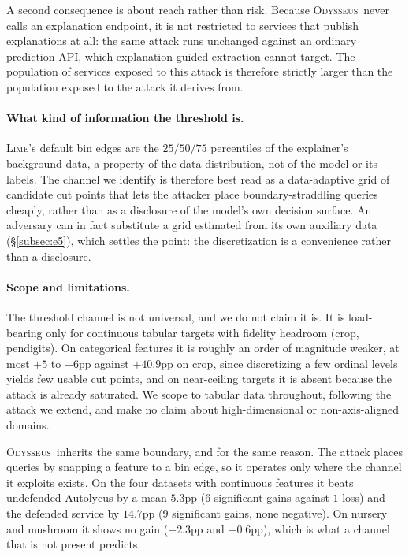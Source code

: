 \documentclass[sigconf,anonymous,review]{acmart}
\newcommand{\sys}{\textsc{Odysseus}}
\begin{document}
A second consequence is about reach rather than risk. Because \sys\ never calls an explanation
endpoint, it is not restricted to services that publish explanations at all: the same attack runs
unchanged against an ordinary prediction API, which explanation-guided extraction cannot target. The
population of services exposed to this attack is therefore strictly larger than the population exposed
to the attack it derives from.

\paragraph{What kind of information the threshold is.} \textsc{Lime}'s default bin edges are the
$25/50/75$ percentiles of the explainer's background data, a property of the data distribution, not of the model or its labels. The channel we identify is therefore best read as a data-adaptive grid of
candidate cut points that lets the attacker place boundary-straddling queries cheaply, rather than as
a disclosure of the model's own decision surface. An adversary can in fact substitute a grid estimated
from its own auxiliary data (\S\ref{subsec:e5}), which settles the point: the discretization is a
convenience rather than a disclosure.

\paragraph{Scope and limitations.} The threshold channel is not universal, and we do not claim it is.
It is load-bearing only for continuous tabular targets with fidelity headroom (crop, pendigits). On
categorical features it is roughly an order of magnitude weaker, at most $+5$ to $+6$pp against
$+40.9$pp on crop, since discretizing a few ordinal levels yields few usable cut points, and on
near-ceiling targets it is absent because the attack is already saturated. We scope to tabular data throughout, following the attack we extend, and make no
claim about high-dimensional or non-axis-aligned domains.

\sys\ inherits the same boundary, and for the same reason. The attack places queries by snapping a
feature to a bin edge, so it operates only where the channel it exploits exists. On the four datasets
with continuous features it beats undefended Autolycus by a mean $5.3$pp ($6$ significant gains
against $1$ loss) and the defended service by $14.7$pp ($9$ significant gains, none negative). On
nursery and mushroom it shows no gain ($-2.3$pp and $-0.6$pp), which is what a channel that is not
present predicts.
\end{document}
